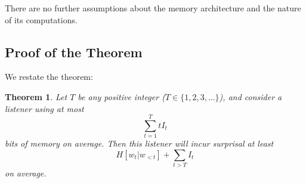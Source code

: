 \documentclass[11pt,letterpaper]{article}
\newcounter{theorem}
\newtheorem{thm}[theorem]{Theorem}
\begin{document}
There are no further assumptions about the memory architecture and the nature of its computations.



\subsection{Proof of the Theorem}

We restate the theorem:

\begin{thm}\label{prop:suboptimal}
	Let $T$ be any positive integer ($T \in \{1, 2, 3, ...\}$), and consider a listener using at most
	\begin{equation}\label{eq:memory}
		\sum_{t=1}^T t I_t
	\end{equation}
bits of memory on average.
Then this listener will incur surprisal at least
	$$H[w_t|w_{<t}] + \sum_{t > T} I_t$$
	on average.
\end{thm}



\end{document}
